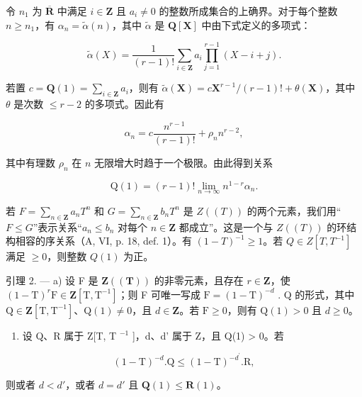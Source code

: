 令 \(n_1\) 为 \(\overline{\mathbf{R}}\) 中满足 \(i \in \mathbf{Z}\) 且 \(a_i \neq 0\) 的整数所成集合的上确界。对于每个整数 \(n \geqslant n_1\)，有 \(\alpha_n = \tilde{\alpha}(n)\)，其中 \(\tilde{\alpha}\) 是 \(\mathbf{Q}[\mathbf{X}]\) 中由下式定义的多项式：

\[
\tilde {\alpha} (X) = \frac {1}{(r - 1) !} \sum_ {i \in \mathbf {Z}} a _ {i} \prod_ {j = 1} ^ {r - 1} (X - i + j).
\]

若置 \(c = \mathbf{Q}(1) = \sum_{i \in \mathbf{Z}} a_i\)，则有 \(\tilde{\alpha}(\mathbf{X}) = c\mathbf{X}^{r-1}/(r - 1)! + \theta(\mathbf{X})\)，其中 \(\theta\) 是次数 \(\leqslant r - 2\) 的多项式。因此有

\[
\alpha_ {n} = c \frac {n ^ {r - 1}}{(r - 1) !} + \rho_ {n} n ^ {r - 2},\tag{2}
\]

其中有理数 \(\rho_{n}\) 在 \(n\) 无限增大时趋于一个极限。由此得到关系

\[
\mathrm{Q} (1) = (r - 1)! \lim _ {n \rightarrow \infty} n ^ {1 - r} \alpha_ {n}.\tag{3}
\]

若 \(F = \sum_{n \in \mathbf{Z}} a_n T^n\) 和 \(G = \sum_{n \in \mathbf{Z}} b_n T^n\) 是 \(Z((T))\) 的两个元素，我们用“\(F \leqslant G\)”表示关系“\(a_n \leqslant b_n\) 对每个 \(n \in \mathbf{Z}\) 都成立”。这是一个与 \(Z((T))\) 的环结构相容的序关系（A, VI, p. 18, def. 1）。有 \((1 - T)^{-1} \geqslant 1\)。若 \(Q \in Z[T, T^{-1}]\) 满足 \(\geqslant 0\)，则整数 \(Q(1)\) 为正。

引理 2. --- a) 设 F 是 \(\mathbf{Z}((\mathbf{T}))\) 的非零元素，且存在 \(r \in \mathbf{Z}\)，使 \((1 - \mathrm{T})^r\mathrm{F} \in \mathbf{Z}[\mathrm{T}, \mathrm{T}^{-1}]\)；则 F 可唯一写成 \(\mathrm{F} = (1 - \mathrm{T})^{-d}\) . Q 的形式，其中 \(\mathrm{Q} \in \mathbf{Z}[\mathrm{T}, \mathrm{T}^{-1}]\)、\(\mathrm{Q}(1) \neq 0\)，且 \(d \in \mathbf{Z}\)。若 \(\mathrm{F} \geqslant 0\)，则有 \(\mathrm{Q}(1) > 0\) 且 \(d \geqslant 0\)。

\begin{enumerate}
\def\labelenumi{\alph{enumi})}
\setcounter{enumi}{1}
\tightlist
\item
  设 Q、R 属于 Z{[}T, T \(^{-1}\) {]}，d、d' 属于 Z，且 Q(1) \textgreater{} 0。若
\end{enumerate}

\[
(1 - \mathrm{T}) ^ {- d}. \mathrm{Q} \leqslant (1 - \mathrm{T}) ^ {- d ^ {\prime}}. \mathrm{R},
\]

则或者 \(d < d'\)，或者 \(d = d'\) 且 \(\mathbf{Q}(1) \leqslant \mathbf{R}(1)\)。

